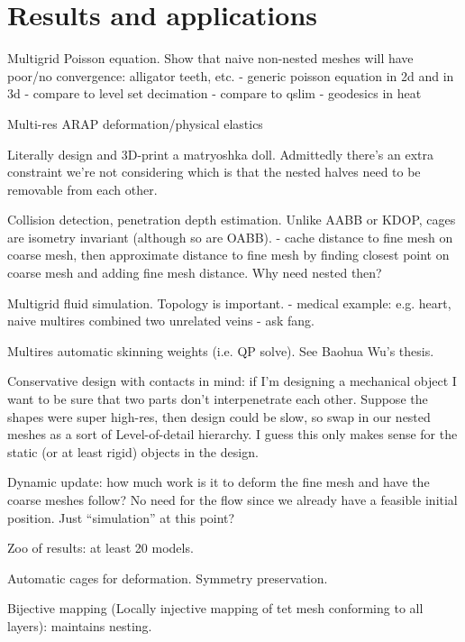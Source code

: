 
\section{Results and applications}
\label{sec:results}

Multigrid Poisson equation. Show that naive non-nested meshes will have
poor/no convergence: alligator teeth, etc.
  - generic poisson equation in 2d and in 3d
    - compare to level set decimation
    - compare to qslim
  - geodesics in heat 

Multi-res ARAP deformation/physical elastics

Literally design and 3D-print a matryoshka doll. Admittedly there's an extra
constraint we're not considering which is that the nested halves need to be
removable from each other.

Collision detection, penetration depth estimation. Unlike AABB or KDOP, cages
are isometry invariant (although so are OABB).
  - cache distance to fine mesh on coarse mesh, then approximate distance to
    fine mesh by finding closest point on coarse mesh and adding fine mesh
    distance. Why need nested then?

Multigrid fluid simulation. Topology is important.
  - medical example: e.g. heart, naive multires combined two unrelated veins
  - ask fang.

Multires automatic skinning weights (i.e. QP solve). See Baohua Wu's thesis.

Conservative design with contacts in mind: if I'm designing a mechanical object
I want to be sure that two parts don't interpenetrate each other. Suppose the
shapes were super high-res, then design could be slow, so swap in our nested
meshes as a sort of Level-of-detail hierarchy. I guess this only makes sense
for the static (or at least rigid) objects in the design.

Dynamic update: how much work is it to deform the fine mesh and have the coarse
meshes follow? No need for the flow since we already have a feasible initial
position. Just ``simulation'' at this point?

Zoo of results: at least 20 models.

Automatic cages for deformation. Symmetry preservation.

Bijective mapping (Locally injective mapping of tet mesh conforming to all
layers): maintains nesting.
